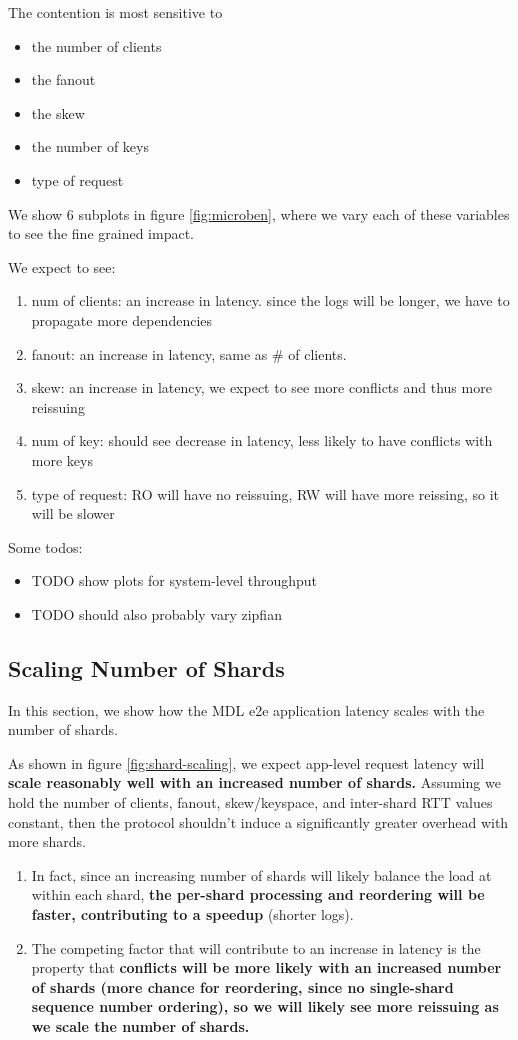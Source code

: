 The contention is most sensitive to
\begin{itemize}
    \item the number of clients
    \item the fanout
    \item the skew
    \item the number of keys
    \item type of request
\end{itemize}

We show 6 subplots in figure \ref{fig:microben}, where we vary each of these variables to see the fine grained impact.

We expect to see:
\begin{enumerate}
    \item num of clients: an increase in latency. since the logs will be longer, we have to propagate more dependencies
    \item fanout: an increase in latency, same as \# of clients.
    \item skew: an increase in latency, we expect to see more conflicts and thus more reissuing
    \item num of key: should see decrease in latency, less likely to have conflicts with more keys
    \item type of request: RO will have no reissuing, RW will have more reissing, so it will be slower
\end{enumerate}

Some todos:
\begin{itemize}
    \item TODO show plots for system-level throughput
    \item TODO should also probably vary zipfian
\end{itemize}

\subsection{Scaling Number of Shards}
In this section, we show how the MDL e2e application latency scales with the number of shards. 

As shown in figure \ref{fig:shard-scaling}, we expect app-level request latency will \textbf{scale reasonably well with an increased number of shards.} Assuming we hold the number of clients, fanout, skew/keyspace, and inter-shard RTT values constant, then the protocol shouldn't induce a significantly greater overhead with more shards. 
\begin{enumerate}
    \item In fact, since an increasing number of shards will likely balance the load at within each shard, \textbf{the per-shard processing and reordering will be faster, contributing to a speedup} (shorter logs). 
    \item The competing factor that will contribute to an increase in latency is the property that \textbf{conflicts will be more likely with an increased number of shards (more chance for reordering, since no single-shard sequence number ordering), so we will likely see more reissuing as we scale the number of shards.}
\end{enumerate}


